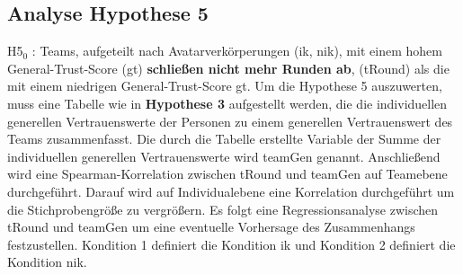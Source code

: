 \documentclass[a4paper,11pt]{article}%
\renewcommand{\\}{\vspace*{0.5\baselineskip} \newline}
\begin{document}
\newpage
	\subsection{Analyse Hypothese 5}
H5$_{0}$ : Teams, aufgeteilt nach Avatarverkörperungen (\ac{ik}, \ac{nik}), mit einem hohem General-Trust-Score (\ac{gt}) \textbf{schließen nicht mehr Runden ab}, (\ac{tRound}) als die mit einem niedrigen General-Trust-Score \ac{gt}.\\
Um die Hypothese 5 auszuwerten, muss eine Tabelle wie in \textbf{Hypothese 3} aufgestellt werden, die die individuellen generellen Vertrauenswerte der Personen zu einem generellen Vertrauenswert des Teams zusammenfasst. Die durch die Tabelle erstellte Variable der Summe der individuellen generellen Vertrauenswerte wird \ac{teamGen} genannt.
Anschließend wird eine Spearman-Korrelation zwischen \ac{tRound} und \ac{teamGen} auf Teamebene durchgeführt. Darauf wird auf Individualebene eine Korrelation durchgeführt um die Stichprobengröße zu vergrößern. Es folgt eine Regressionsanalyse zwischen \ac{tRound} und \ac{teamGen} um eine eventuelle Vorhersage des Zusammenhangs festzustellen. Kondition 1 definiert die Kondition \ac{ik} und Kondition 2 definiert die Kondition \ac{nik}.
\end{document}
